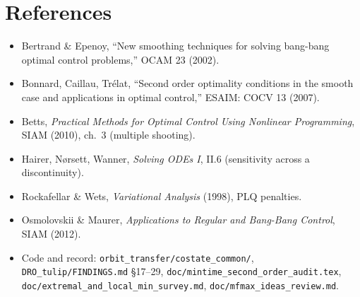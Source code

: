 \documentclass[11pt]{article}
\newcommand{\file}[1]{\texttt{#1}}
\begin{document}
\section*{References}
\begin{itemize}
\item Bertrand \& Epenoy, ``New smoothing techniques for solving bang-bang optimal control problems,'' OCAM 23 (2002).
\item Bonnard, Caillau, Tr\'elat, ``Second order optimality conditions in the smooth case and applications in optimal control,'' ESAIM: COCV 13 (2007).
\item Betts, \emph{Practical Methods for Optimal Control Using Nonlinear Programming}, SIAM (2010), ch.~3 (multiple shooting).
\item Hairer, N\o rsett, Wanner, \emph{Solving ODEs I}, II.6 (sensitivity across a discontinuity).
\item Rockafellar \& Wets, \emph{Variational Analysis} (1998), PLQ penalties.
\item Osmolovskii \& Maurer, \emph{Applications to Regular and Bang-Bang Control}, SIAM (2012).
\item Code and record: \file{orbit\_transfer/costate\_common/}, \file{DRO\_tulip/FINDINGS.md} \S17--29, \file{doc/mintime\_second\_order\_audit.tex}, \file{doc/extremal\_and\_local\_min\_survey.md}, \file{doc/mfmax\_ideas\_review.md}.
\end{itemize}
\end{document}
